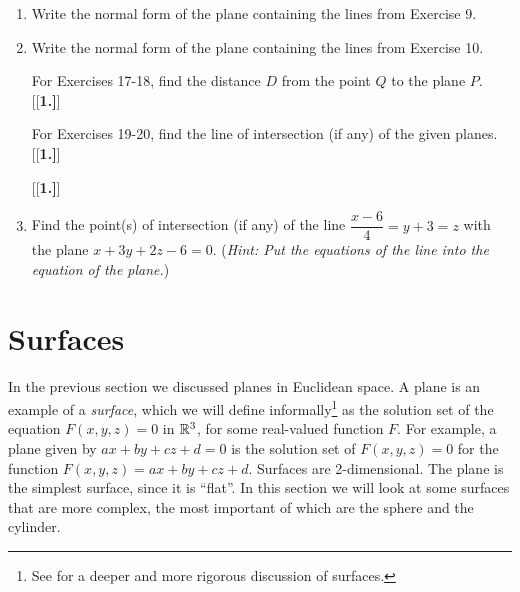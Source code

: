 \begin{enumerate}[\bfseries 1.]
\par\noindent For Exercises 13-14, write the normal form of the plane containing the given points.
[{[\bfseries 1.]}]
 \item Write the normal form of the plane containing the lines from Exercise 9.
 \item Write the normal form of the plane containing the lines from Exercise 10.
\par\noindent For Exercises 17-18, find the distance $D$ from the point $Q$ to the plane $P$.
[{[\bfseries 1.]}]
\par\noindent For Exercises 19-20, find the line of intersection (if any) of the given planes.
[{[\bfseries 1.]}]
[{[\bfseries 1.]}]
 \item Find the point(s) of intersection (if any) of the line $\dfrac{x - 6}{4} = y + 3 = z$ with the plane
 $x + 3y + 2z - 6 = 0$. (\emph{Hint: Put the equations of the line into the equation of the plane.})
\end{enumerate}
\newpage
\section{Surfaces}
In the previous section we discussed planes in Euclidean space. A plane is an example of a \emph{surface}, which we
will define informally\footnote{See \cite{one} for a deeper and more rigorous discussion of surfaces.} as the
solution set of the equation $F(x,y,z) = 0$ in $\mathbb{R}^{3}$, for some real-valued function $F$. For example, a plane
given by $ax + by + cz + d = 0$ is the solution set of $F(x,y,z) = 0$ for the function $F(x,y,z) = ax + by + cz + d$.
Surfaces are 2-dimensional. The plane is the simplest surface, since it is ``flat''. In this
section we will look at some surfaces that are more complex, the most important of which are the sphere and the
cylinder.

